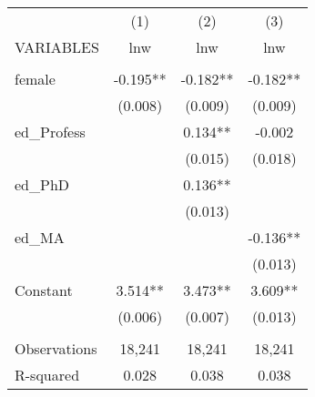 \begin{tabular}{lccc} \hline
 & (1) & (2) & (3) \\
VARIABLES & lnw & lnw & lnw \\ \hline
 &  &  &  \\
female & -0.195** & -0.182** & -0.182** \\
 & (0.008) & (0.009) & (0.009) \\
ed\_Profess &  & 0.134** & -0.002 \\
 &  & (0.015) & (0.018) \\
ed\_PhD &  & 0.136** &  \\
 &  & (0.013) &  \\
ed\_MA &  &  & -0.136** \\
 &  &  & (0.013) \\
Constant & 3.514** & 3.473** & 3.609** \\
 & (0.006) & (0.007) & (0.013) \\
 &  &  &  \\
Observations & 18,241 & 18,241 & 18,241 \\
 R-squared & 0.028 & 0.038 & 0.038 \\ \hline
\end{tabular}
